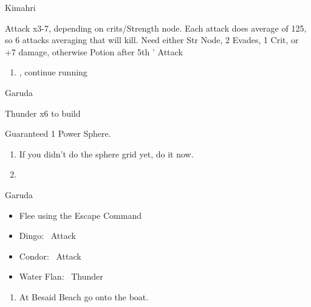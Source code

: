 \begin{battle}[750]{Kimahri}
	\begin{itemize}
		\tidusf Attack x3-7, depending on crits/Strength node.
		\tidusf Each attack does average of 125, so 6 attacks averaging that will kill.
		\tidusf Need either Str Node, 2 Evades, 1 Crit, or +7 damage, otherwise Potion after 5th \tidus' Attack
	\end{itemize}
\end{battle}
\begin{enumerate}[resume]
	\item \sd, continue running
\end{enumerate}
\begin{battle}{Garuda}
	\begin{itemize}
		\summon{\valefor}
		\valeforf Thunder x6 to build \od
	\end{itemize}
Guaranteed 1 Power Sphere.
\end{battle}
\begin{enumerate}[resume]
	\item If you didn't do the sphere grid yet, do it now.
	\item \formation{\tidus}{\yuna}{\lulu}
\end{enumerate}
\begin{battle}{Garuda}
	\begin{itemize}
		\item Flee using the Escape Command
	\end{itemize}
\end{battle}
\begin{encounters}
	\begin{itemize}
		\item Dingo: \tidus\ Attack
		\item Condor: \wakka\ Attack
		\item Water Flan: \lulu\ Thunder
	\end{itemize}
\end{encounters}
\begin{enumerate}[resume]
	\item At Besaid Beach go onto the boat.
\end{enumerate}
